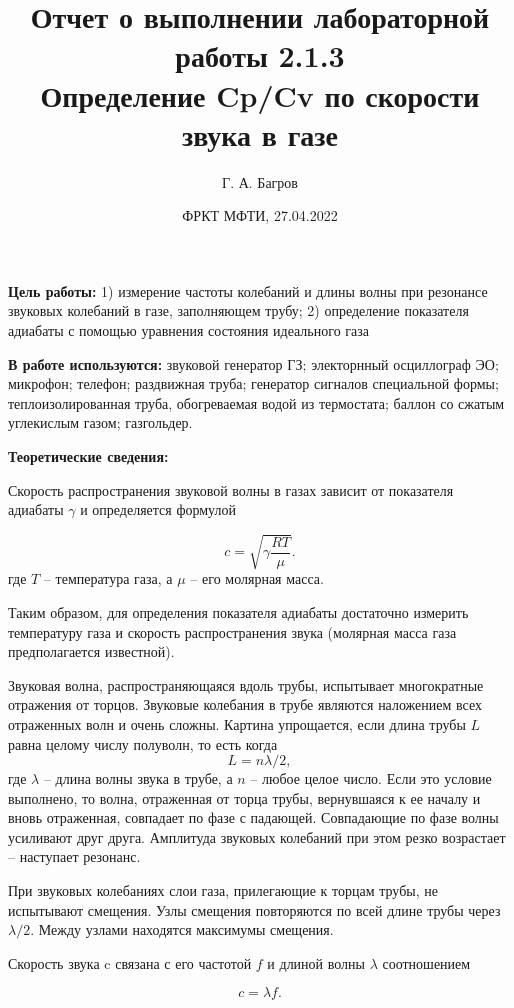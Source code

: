 \documentclass[a4paper,11pt]{extarticle} %
\title{Отчет о выполнении лабораторной работы 2.1.3 \\ 
\textbf{Определение Cp/Cv по скорости звука в газе}}
\author{Г. А. Багров}
\date{ ФРКТ МФТИ, 27.04.2022 \\}
\begin{document}
\maketitle 
\vspace {15 mm}
\textbf{Цель работы:} 1) измерение частоты колебаний и длины волны при резонансе звуковых колебаний в газе, заполняющем трубу; 2) определение показателя адиабаты с помощью уравнения состояния идеального газа

\textbf{В работе используются:} звуковой генератор ГЗ; электорнный осциллограф ЭО; микрофон; телефон; раздвижная труба; генератор сигналов специальной формы; теплоизолированная труба, обогреваемая водой из термостата; баллон со сжатым углекислым газом; газгольдер.


\textbf{Теоретические сведения:}

Скорость распространения звуковой волны в газах зависит от показателя адиабаты $ \gamma $ и определяется формулой

\begin{equation}\label{velocity}
c=\sqrt{\gamma\frac{RT}{\mu}}.
\end{equation}
где $ T $ -- температура газа, а $ \mu $ -- его молярная масса.

Таким образом, для определения показателя адиабаты достаточно измерить температуру газа и скорость распространения звука (молярная масса газа предполагается известной).

Звуковая волна, распространяющаяся вдоль трубы, испытывает многократные отражения от торцов. Звуковые колебания в трубе являются наложением всех отраженных волн и очень сложны. Картина упрощается, если длина трубы $ L $ равна целому числу полуволн, то есть когда \[ L=n\lambda/2, \] где $ \lambda $ -- длина волны звука в трубе, а $ n $ -- любое целое число. Если это условие выполнено, то волна, отраженная от торца трубы, вернувшаяся к ее началу и вновь отраженная, совпадает по фазе с падающей. Совпадающие по фазе волны усиливают друг друга. Амплитуда звуковых колебаний при этом резко возрастает -- наступает резонанс.

При звуковых колебаниях слои газа, прилегающие к торцам трубы, не испытывают смещения. Узлы смещения повторяются по всей длине трубы через $ \lambda/2 $. Между узлами находятся максимумы смещения.

Скорость звука c связана с его частотой $ f $ и длиной волны $ \lambda $ соотношением

\begin{equation}\label{lambda_f}
c=\lambda f.
\end{equation}
\end{document}
